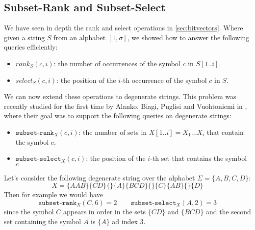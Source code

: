 \subsection{Subset-Rank and Subset-Select} \label{sec:subset_rank_select}
We have seen in depth the rank and select operations in \autoref{sec:bitvectors}. Where given a string $S$ from an alphabet $[1,\sigma]$, we showed how to answer the following queries efficiently:
\begin{itemize}
    \item $rank_S(c, i)$: the number of occurrences of the symbol $c$ in $S[1..i]$.
    \item $select_S(c, i)$: the position of the $i$-th occurrence of the symbol $c$ in $S$.
\end{itemize}
We can now extend these operations to degenerate strings. This problem was recently studied for the first time by Alanko, Biagi, Puglisi and Vuohtoniemi in \cite{SubsetWT}, where their goal was to support the following queries on degenerate strings:
\begin{itemize}
    \item $\texttt{subset-rank}_X(c, i)$: the number of sets in $X[1..i]=X_1 \dots X_i$ that contain the symbol $c$.
    \item $\texttt{subset-select}_X(c, i)$: the position of the $i$-th set that contains the symbol $c$
\end{itemize}
\begin{example}
    Let's consider the following degenerate string over the alphabet $\Sigma = \{A, B, C, D\}$:
    \[
        X = \{AAB\} \{CD\} \{\} \{A\} \{BCD\} \{\} \{C\} \{AB\} \{\} \{D\}
    \]
    Then for example we would have
    \begin{equation*}
        \texttt{subset-rank}_X(C, 6) = 2 \qquad \texttt{subset-select}_X(A, 2) = 3
    \end{equation*}
    since the symbol $C$ appears in order in the sets $\{CD\}$ and $\{BCD\}$ and the second set containing the symbol $A$ is $\{A\}$ ad index $3$.
\end{example}
